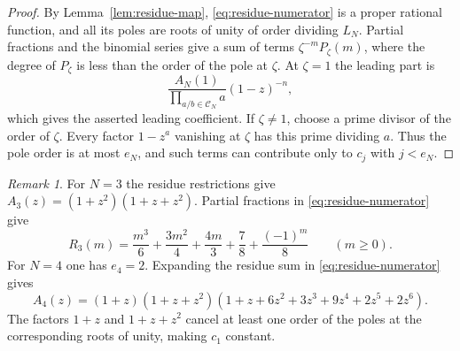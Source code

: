 \documentclass[11pt]{amsart}
\theoremstyle{remark}
\newtheorem{remark}[theorem]{Remark}
\newcommand{\CN}{\mathcal C_N}
\begin{document}
\begin{proof}
By Lemma~\ref{lem:residue-map}, \eqref{eq:residue-numerator} is a proper rational function, and all its poles are roots of unity of order dividing \(L_N\). Partial fractions and the binomial series give a sum of terms \(\zeta^{-m}P_\zeta(m)\), where the degree of \(P_\zeta\) is less than the order of the pole at \(\zeta\). At \(\zeta=1\) the leading part is
\[
 \frac{A_N(1)}{\prod_{a/b\in\CN}a}(1-z)^{-n},
\]
which gives the asserted leading coefficient. If \(\zeta\ne1\), choose a prime divisor of the order of \(\zeta\). Every factor \(1-z^a\) vanishing at \(\zeta\) has this prime dividing \(a\). Thus the pole order is at most \(e_N\), and such terms can contribute only to \(c_j\) with \(j<e_N\).
\end{proof}

\begin{remark}\label{ex:fixed-small}
For \(N=3\) the residue restrictions give \(A_3(z)=(1+z^2)(1+z+z^2)\). Partial fractions in \eqref{eq:residue-numerator} give
\[
 R_3(m)=\frac{m^3}{6}+\frac{3m^2}{4}+\frac{4m}{3}+\frac78+\frac{(-1)^m}{8}
 \qquad (m\ge0).
\]
For \(N=4\) one has \(e_4=2\). Expanding the residue sum in
\eqref{eq:residue-numerator} gives
\[
 A_4(z)=(1+z)(1+z+z^2)(1+z+6z^2+3z^3+9z^4+2z^5+2z^6).
\]
The factors \(1+z\) and \(1+z+z^2\) cancel at least one order of the
poles at the corresponding roots of unity, making \(c_1\) constant.
\end{remark}
\end{document}
